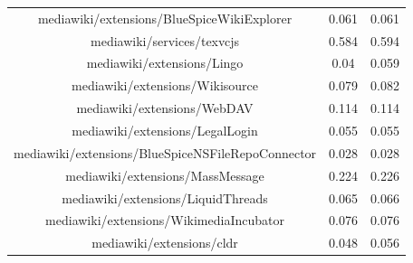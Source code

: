 \begin{center}
\begin{tabular}{@{}c c c@{}}
mediawiki/extensions/BlueSpiceWikiExplorer & 0.061 & 0.061 \\
mediawiki/services/texvcjs & 0.584 & 0.594 \\
mediawiki/extensions/Lingo & 0.04 & 0.059 \\
mediawiki/extensions/Wikisource & 0.079 & 0.082 \\
mediawiki/extensions/WebDAV & 0.114 & 0.114 \\
mediawiki/extensions/LegalLogin & 0.055 & 0.055 \\
mediawiki/extensions/BlueSpiceNSFileRepoConnector & 0.028 & 0.028 \\
mediawiki/extensions/MassMessage & 0.224 & 0.226 \\
mediawiki/extensions/LiquidThreads & 0.065 & 0.066 \\
mediawiki/extensions/WikimediaIncubator & 0.076 & 0.076 \\
mediawiki/extensions/cldr & 0.048 & 0.056 \\
 \hline
\end{tabular}
\end{center}

